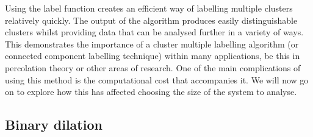 Using the label function creates an efficient way of labelling multiple clusters relatively quickly.
The output of the algorithm produces easily distinguishable clusters whilst providing data that can be analysed further in a variety of ways. 
This demonstrates the importance of a cluster multiple labelling algorithm (or connected component labelling technique) within many applications, 
be this in percolation theory or other areas of research. 
One of the main complications of using this method is the computational cost that accompanies it. 
We will now go on to explore how this has affected choosing the size of the system to analyse.



\newpage

\subsection{Binary dilation}
\label{sec:a-binary-dialator}

